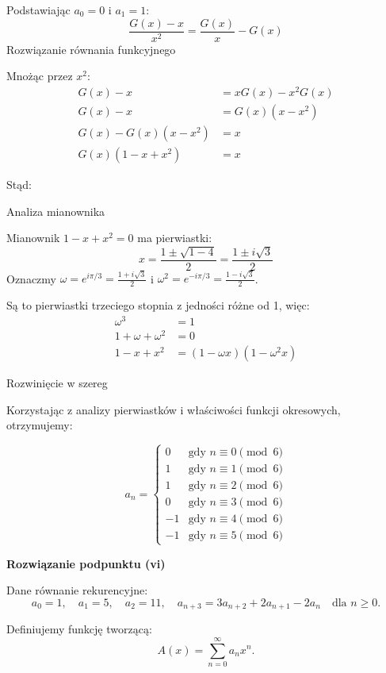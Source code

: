 \documentclass{mwart}
\begin{document}
\begin{mdframed}
    Podstawiając $a_0 = 0$ i $a_1 = 1$:
    \[
    \frac{G(x) - x}{x^2} = \frac{G(x)}{x} - G(x)
    \]
    Rozwiązanie równania funkcyjnego

    Mnożąc przez $x^2$:
    \begin{align}
    G(x) - x &= xG(x) - x^2G(x) \\
    G(x) - x &= G(x)(x - x^2) \\
    G(x) - G(x)(x - x^2) &= x \\
    G(x)(1 - x + x^2) &= x
    \end{align}

    Stąd:


    Analiza mianownika

    Mianownik $1 - x + x^2 = 0$ ma pierwiastki:
    \[
    x = \frac{1 \pm \sqrt{1-4}}{2} = \frac{1 \pm i\sqrt{3}}{2}
    \]
    Oznaczmy $\omega = e^{i\pi/3} = \frac{1 + i\sqrt{3}}{2}$ i $\omega^2 = e^{-i\pi/3} = \frac{1 - i\sqrt{3}}{2}$.

    Są to pierwiastki trzeciego stopnia z jedności różne od 1, więc:
    \begin{align}
    \omega^3 &= 1 \\
    1 + \omega + \omega^2 &= 0 \\
    1 - x + x^2 &= (1 - \omega x)(1 - \omega^2 x)
    \end{align}

    Rozwinięcie w szereg

    Korzystając z analizy pierwiastków i właściwości funkcji okresowych, otrzymujemy:

    \[
    a_n = \begin{cases}
    0 & \text{gdy } n \equiv 0 \pmod{6} \\
    1 & \text{gdy } n \equiv 1 \pmod{6} \\
    1 & \text{gdy } n \equiv 2 \pmod{6} \\
    0 & \text{gdy } n \equiv 3 \pmod{6} \\
    -1 & \text{gdy } n \equiv 4 \pmod{6} \\
    -1 & \text{gdy } n \equiv 5 \pmod{6}
    \end{cases}
    \]


    \textbf{Rozwiązanie podpunktu (vi)}

    Dane równanie rekurencyjne:
    \[
    a_0 = 1,\quad a_1 = 5,\quad a_2 = 11,\quad a_{n+3} = 3a_{n+2} + 2a_{n+1} - 2a_n \quad \text{dla } n \geq 0.
    \]

    Definiujemy funkcję tworzącą:
    \[
    A(x) = \sum_{n=0}^{\infty} a_n x^n.
    \]


\end{mdframed}
\end{document}
